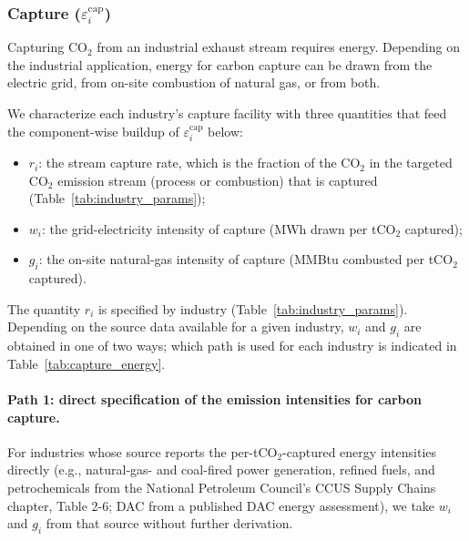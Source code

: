 \documentclass[11pt]{article}
\newcommand{\cotwo}{\ensuremath{\mathrm{CO_2}}}
\begin{document}
\subsubsection{Capture ($\varepsilon_i^{\text{cap}}$)}
\label{sec:capture}

Capturing \cotwo{} from an industrial exhaust stream requires energy. Depending on the industrial application, energy for carbon capture can be drawn from the electric grid, from on-site combustion of natural gas, or from both.

We characterize each industry's capture facility with three quantities that feed the component-wise buildup of $\varepsilon_i^{\text{cap}}$ below:
\begin{itemize}
  \item $r_i$: the stream capture rate, which is the fraction of the \cotwo{} in the targeted \cotwo{} emission stream (process or combustion) that is captured (Table~\ref{tab:industry_params});
  \item $w_i$: the grid-electricity intensity of capture (MWh drawn per t\cotwo{} captured);
  \item $g_i$: the on-site natural-gas intensity of capture (MMBtu combusted per t\cotwo{} captured).
\end{itemize}

\noindent
The quantity $r_i$ is specified by industry (Table~\ref{tab:industry_params}). Depending on the source data available for a given industry, $w_i$ and $g_i$ are obtained in one of two ways; which path is used for each industry is indicated in Table~\ref{tab:capture_energy}.

\paragraph{Path 1: direct specification of the emission intensities for carbon capture.}
For industries whose source reports the per-t\cotwo{}-captured energy intensities directly (e.g., natural-gas- and coal-fired power generation, refined fuels, and petrochemicals from the National Petroleum Council's CCUS Supply Chains chapter, Table 2-6; DAC from a published DAC energy assessment), we take $w_i$ and $g_i$ from that source without further derivation.
\end{document}
